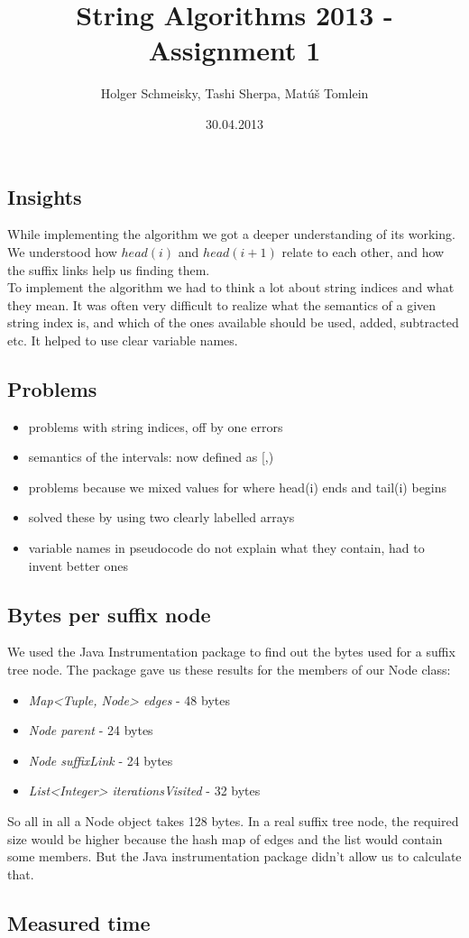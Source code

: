 \documentclass[a4paper,10pt]{article}
\title{String Algorithms 2013 - Assignment 1}
\author{Holger Schmeisky, Tashi Sherpa, Matúš Tomlein}
\date{30.04.2013}
\begin{document}
\maketitle

\subsection*{Insights}
While implementing the algorithm we got a deeper understanding of its working. We understood how $head(i)$ and $head(i+1)$ relate to each other, and how the suffix links help us finding them.\\
To implement the algorithm we had to think a lot about string indices and what they mean. It was often very difficult to realize what the semantics of a given string index is, and which of the ones available should be used, added, subtracted etc. It helped to use clear variable names.

\subsection*{Problems}
\begin{itemize}
  \item problems with string indices, off by one errors
  \item semantics of the intervals: now defined as [,)
  \item problems because we mixed values for where head(i) ends and tail(i) begins
  \item solved these by using two clearly labelled arrays
  \item variable names in pseudocode do not explain what they contain, had to invent better ones
\end{itemize}

\subsection*{Bytes per suffix node}

We used the Java Instrumentation package to find out the bytes used for a suffix tree node.
The package gave us these results for the members of our Node class:

\begin{itemize}
	\item \emph{Map{\textless}Tuple, Node{\textgreater} edges} - 48 bytes
	\item \emph{Node parent} - 24 bytes
	\item \emph{Node suffixLink} - 24 bytes
	\item \emph{List{\textless}Integer{\textgreater} iterationsVisited} - 32 bytes
\end{itemize}

So all in all a Node object takes 128 bytes.
In a real suffix tree node, the required size would be higher because the hash map of edges and the list would contain some members.
But the Java instrumentation package didn't allow us to calculate that.

\subsection*{Measured time}
\end{document}
